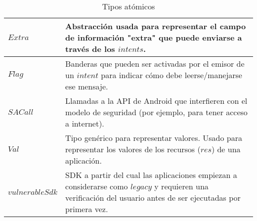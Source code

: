 \begin{table}[thb!]
\begin{tabularx}{\linewidth}{|l X|}
        \hline
        $Extra$                  & Abstracción usada para representar el campo de información "extra" que puede enviarse a través de los $intents$.      \\
        \hline
        $Flag$                   & Banderas que pueden ser activadas por el emisor de un $intent$ para indicar cómo debe leerse/manejarse ese mensaje.   \\
        \hline
        $SACall$                 & Llamadas a la API de Android que interfieren con el modelo de seguridad (por ejemplo, para tener acceso a internet).  \\
        \hline
        $Val$                    & Tipo genérico para representar valores. Usado para representar los valores de los recursos ($res$) de una aplicación. \\
        \hline
        $vulnerableSdk$          & SDK a partir del cual las aplicaciones empiezan a considerarse como
        $legacy$ y requieren una verificación del usuario antes de ser ejecutadas por primera vez.                                                       \\
        \hline
    \end{tabularx}
    \caption{Tipos atómicos}
    \label{table:atomic_types}
\end{table}
